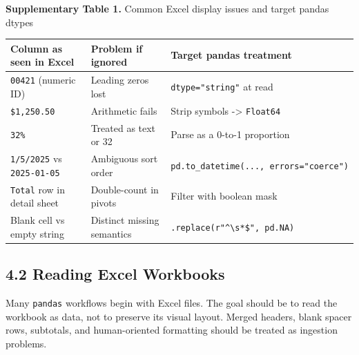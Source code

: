 \documentclass[
  12pt,
]{article}
\newcounter{none} %
\begin{document}
\textbf{Supplementary Table 1.} Common Excel display issues and target
pandas dtypes

{\def\LTcaptype{none} %
\begin{longtable}[]{@{}
  >{\raggedright\arraybackslash}p{}
  >{\raggedright\arraybackslash}p{}
  >{\raggedright\arraybackslash}p{}@{}}
\toprule\noalign{}
\begin{minipage}[b]{\linewidth}\raggedright
Column as seen in Excel
\end{minipage} & \begin{minipage}[b]{\linewidth}\raggedright
Problem if ignored
\end{minipage} & \begin{minipage}[b]{\linewidth}\raggedright
Target pandas treatment
\end{minipage} \\
\midrule\noalign{}
\endhead
\bottomrule\noalign{}
\endlastfoot
\texttt{00421} (numeric ID) & Leading zeros lost &
\texttt{dtype="string"} at read \\
\texttt{\$1,250.50} & Arithmetic fails & Strip symbols -\textgreater{}
\texttt{Float64} \\
\texttt{32\%} & Treated as text or 32 & Parse as a 0-to-1 proportion \\
\texttt{1/5/2025} vs \texttt{2025-01-05} & Ambiguous sort order &
\texttt{pd.to\_datetime(...,\ errors="coerce")} \\
\texttt{Total} row in detail sheet & Double-count in pivots & Filter
with boolean mask \\
Blank cell vs empty string & Distinct missing semantics &
\texttt{.replace(r"\^{}\textbackslash{}s*\$",\ pd.NA)} \\
\end{longtable}
}

\subsection{4.2 Reading Excel Workbooks}\label{reading-excel-workbooks}

Many \texttt{pandas} workflows begin with Excel files. The goal should
be to read the workbook as data, not to preserve its visual layout.
Merged headers, blank spacer rows, subtotals, and human-oriented
formatting should be treated as ingestion problems.
\end{document}
